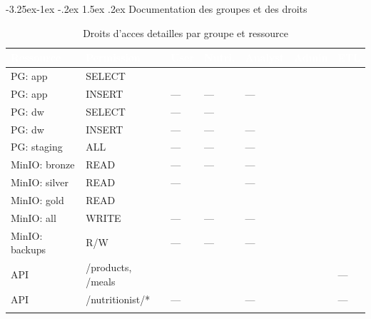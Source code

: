 \documentclass[a4paper,11pt,oneside,openany]{report}
\makeatletter
\renewcommand\subsection{\@startsection{subsection}{2}{\z@}%
  {-3.25ex\@plus -1ex \@minus -.2ex}%
  {1.5ex \@plus .2ex}%
  {\normalfont\large\bfseries\color{ntdarkgreen}}}
\makeatother
\begin{document}
\subsection{Documentation des groupes et des droits}

\newcommand{\cmark}{\textcolor{ntgreen}{\faCheckCircle}}
\newcommand{\xmark}{\textcolor{ntgray!40}{---}}

\begin{table}[H]
\centering
\caption{Droits d'acces detailles par groupe et ressource}
\label{tab:detailed-rights}
\small
{}
\begin{tabularx}{\textwidth}{L{2cm} L{2.2cm} C{1cm} C{1cm} C{1cm} C{1cm} C{1cm}}
\toprule
{}
\textcolor{white}{\textbf{Ressource}} & \textcolor{white}{\textbf{Permission}} & \textcolor{white}{\textbf{User}} & \textcolor{white}{\textbf{Nutri.}} & \textcolor{white}{\textbf{Analyst}} & \textcolor{white}{\textbf{Admin}} & \textcolor{white}{\textbf{ETL}} \\
\midrule
{}
PG: app & SELECT & \cmark & \cmark & \cmark & \cmark & \cmark \\
PG: app & INSERT & \xmark & \xmark & \xmark & \cmark & \cmark \\
PG: dw & SELECT & \xmark & \xmark & \cmark & \cmark & \cmark \\
PG: dw & INSERT & \xmark & \xmark & \xmark & \cmark & \cmark \\
PG: staging & ALL & \xmark & \xmark & \xmark & \cmark & \cmark \\
\midrule
{}
MinIO: bronze & READ & \xmark & \xmark & \xmark & \cmark & \cmark \\
MinIO: silver & READ & \xmark & \cmark & \xmark & \cmark & \cmark \\
MinIO: gold & READ & \cmark & \cmark & \cmark & \cmark & \cmark \\
MinIO: all & WRITE & \xmark & \xmark & \xmark & \cmark & \cmark \\
MinIO: backups & R/W & \xmark & \xmark & \xmark & \cmark & \cmark \\
\midrule
{}
API & /products, /meals & \cmark & \cmark & \cmark & \cmark & \xmark \\
API & /nutritionist/* & \xmark & \cmark & \xmark & \cmark & \xmark \\

\end{tabularx}
\end{table}
\end{document}
